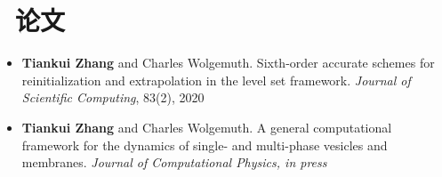 \documentclass{resume}
\begin{document}
\section{\faBook\ 论文}
\begin{itemize}[parsep=0.5ex]
  \item \textbf{Tiankui Zhang} and Charles Wolgemuth. Sixth-order accurate schemes for reinitialization and extrapolation in the level set framework. \textit{Journal of Scientific Computing}, 83(2), 2020
  \item \textbf{Tiankui Zhang} and Charles Wolgemuth. A general computational framework for the dynamics of single- and multi-phase vesicles and membranes. \textit{Journal of Computational Physics, in press}
\end{itemize}



%
%
\end{document}
